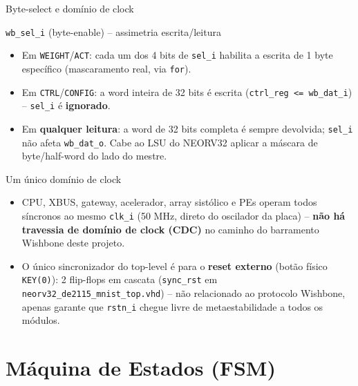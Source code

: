 \documentclass[aspectratio=169,10pt]{beamer}
\begin{document}
\begin{frame}{Byte-select e domínio de clock}
  \begin{block}{\texttt{wb\_sel\_i} (byte-enable) -- assimetria escrita/leitura}
    \begin{itemize}
      \item Em \texttt{WEIGHT}/\texttt{ACT}: cada um dos 4 bits de \texttt{sel\_i}
        habilita a escrita de 1 byte específico (mascaramento real, via \texttt{for}).
      \item Em \texttt{CTRL}/\texttt{CONFIG}: a word inteira de 32 bits é escrita
        (\texttt{ctrl\_reg <= wb\_dat\_i}) -- \texttt{sel\_i} é \textbf{ignorado}.
      \item Em \textbf{qualquer leitura}: a word de 32 bits completa é sempre
        devolvida; \texttt{sel\_i} não afeta \texttt{wb\_dat\_o}. Cabe ao LSU do
        NEORV32 aplicar a máscara de byte/half-word do lado do mestre.
    \end{itemize}
  \end{block}

  \begin{block}{Um único domínio de clock}
    \begin{itemize}
      \item CPU, XBUS, gateway, acelerador, array sistólico e PEs operam todos
        síncronos ao mesmo \texttt{clk\_i} (50 MHz, direto do oscilador da
        placa) -- \textbf{não há travessia de domínio de clock (CDC)} no
        caminho do barramento Wishbone deste projeto.
      \item O único sincronizador do top-level é para o \textbf{reset externo}
        (botão físico \texttt{KEY(0)}): 2 flip-flops em cascata
        (\texttt{sync\_rst} em \texttt{neorv32\_de2115\_mnist\_top.vhd}) --
        não relacionado ao protocolo Wishbone, apenas garante que
        \texttt{rstn\_i} chegue livre de metaestabilidade a todos os módulos.
    \end{itemize}
  \end{block}
\end{frame}

\section{Máquina de Estados (FSM)}
\end{document}
